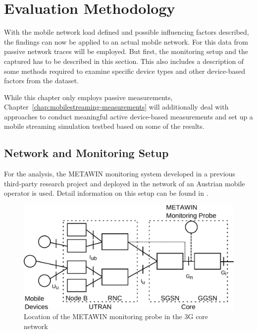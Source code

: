 \section{Evaluation Methodology}
\label{c4:sec:methodology}

With the mobile network load defined and possible influencing factors described, the findings can now be applied to an actual mobile network. For this data from passive network traces will be employed. But first, the monitoring setup and the captured has to be described in this section. This also includes a description of some methods required to examine specific device types and other device-based factors from the dataset.

While this chapter only employs passive measurements, Chapter~\ref{chap:mobilestreaming-measurements} will additionally deal with approaches to conduct meaningful active device-based measurements and set up a mobile streaming simulation testbed based on some of the results.


\subsection{Network and Monitoring Setup}

For the analysis, the \gls{METAWIN} monitoring system developed in a previous third-party research project and deployed in the network of an Austrian mobile operator is used. Detail information on this setup can be found in \cite{ricciato_2011,ricciato2006traffic}.

\begin{figure}[htb]
	\centering
	\includegraphics[width=1.0\textwidth]{images/umts-network.pdf}
	\caption{Location of the \acrshort{METAWIN} monitoring probe in the \gls{3G} core network}
\label{c4:fig:umtsnetwork}
\end{figure}

